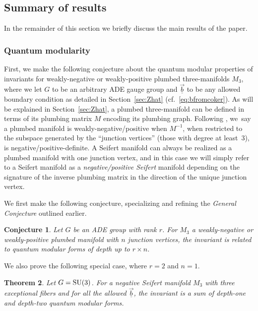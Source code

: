 \documentclass[pdftex]{sigma}
\def\Zh{\widehat{Z}}
\newcommand{\Zhlong}[3]{\ensuremath{\widehat{Z}^{#1}_{#2}\left(#3;\tau\right)}}
\def\bv{{\vec{\underline{b}}}}
\newtheorem{thm}{Theorem}[section]
\newtheorem{conj}[thm]{Conjecture}
\theoremstyle{definition}
\numberwithin{equation}{section}
\begin{document}
\subsection{Summary of results}\label{subsec:sum}
In the remainder of this section we briefly discuss the main results of the paper.

\subsubsection*{Quantum modularity}
First, we make the following conjecture about the quantum modular properties of \smash{$\Zh^G_{\vec{\underline{b}}}(M_3)$} invariants for weakly-negative or weakly-positive plumbed three-manifolds $M_3$, where we let $G$ to be an arbitrary ADE gauge group and $\vec{\underline{b}}$ to be any allowed boundary condition as detailed in Section~\ref{sec:Zhat} (cf.\ \eqref{eq:bfromcoker}). As will be explained in Section~\ref{sec:Zhat}, a plumbed three-manifold can be defined in terms of its plumbing matrix $M$ encoding its plumbing graph. Following \cite{cheng20193d}, we~say a plumbed manifold is weakly-negative/positive when $M^{-1}$, when restricted to the subspace generated by the ``junction vertices'' (those with degree at least~3), is negative/positive-definite. A Seifert manifold can always be realized as a plumbed manifold with one junction vertex, and in this case we will simply refer to a Seifert manifold as a {\it negative/positive Seifert} manifold depending on the signature of the inverse plumbing matrix in the direction of the unique junction vertex.

We first make the following conjecture, specializing and refining the {\it General Conjecture} outlined earlier.
\begin{conj}\label{conj_qmf}
Let $G$ be an ADE group with rank $r$. For $M_3$ a weakly-negative or weakly-positive plumbed manifold with $n$ junction vertices, the invariant \smash{$\Zhlong{G}{\bv}{M_3}$} is related to quantum modular forms of depth up to $r\times n$.
\end{conj}

We also prove the following special case, where $r=2$ and $n=1$.

\begin{thm}\label{thm1_intro}
 Let $G={\rm SU}(3)$. For a negative Seifert manifold $M_3$ with three exceptional fibers and for all the allowed ${\vec{\underline{b}}}$, the invariant \smash{$\Zhlong{G}{\bv}{M_3}$} is a sum of depth-one and depth-two quantum modular forms.
\end{thm}
\end{document}
